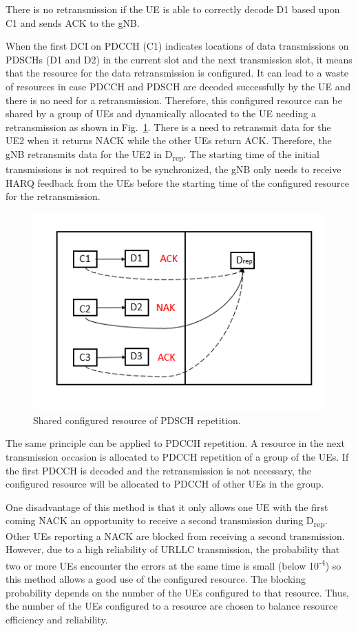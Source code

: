 \documentclass[conference,10pt]{IEEEtran}
\begin{document}
There is no retransmission if the UE is able to correctly decode D1 based upon C1 and sends ACK to the gNB.

When the first DCI on PDCCH (C1) indicates locations of data transmissions on PDSCHs (D1 and D2) in the current slot and the next transmission slot, it means that the resource for the data retransmission is configured. It can lead to a waste of resources in case PDCCH and PDSCH are decoded successfully by the UE and there is no need for a retransmission. Therefore, this configured resource can be shared by a group of UEs and dynamically allocated to the UE needing a retransmission as shown in Fig.~\ref{fig2}. There is a need to retransmit data for the UE2 when it returns NACK while the other UEs return ACK. Therefore, the gNB retransmits data for the UE2 in D\textsubscript{rep}. The starting time of the initial transmissions is not required to be synchronized, the gNB only needs to receive HARQ feedback from the UEs before the starting time of the configured resource for the retransmission.

\begin{figure}[htb]
\centerline{\includegraphics[scale=0.4]{fig2.png}}
\caption{Shared configured resource of PDSCH repetition.}
\label{fig2}
\end{figure}

The same principle can be applied to PDCCH repetition. A resource in the next transmission occasion is allocated to PDCCH repetition of a group of the UEs. If the first PDCCH is decoded and the retransmission is not necessary, the configured resource will be allocated to PDCCH of other UEs in the group.

One disadvantage of this method is that it only allows one UE with the first coming NACK an opportunity to receive a second transmission during D\textsubscript{rep}. Other UEs reporting a NACK are blocked from receiving a second transmission. However, due to a high reliability of URLLC transmission, the probability that two or more UEs encounter the errors at the same time is small (below 10\textsuperscript{-4}) so this method allows a good use of the configured resource. The blocking probability depends on the number of the UEs configured to that resource. Thus, the number of the UEs configured to a resource are chosen to balance resource efficiency and reliability.
\end{document}
